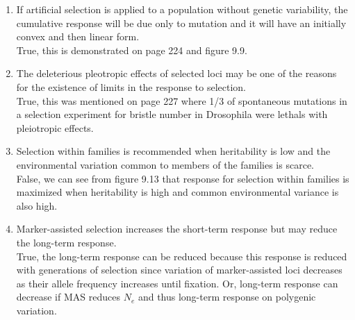 \documentclass[12pt]{amsart}
\begin{document}
\begin{enumerate}
\item If artificial selection is applied to a population without genetic variability, the cumulative response will be due only to mutation and it will have an initially convex and then linear form.\\
True, this is demonstrated on page 224 and figure 9.9.\\
\item The deleterious pleotropic effects of selected loci may be one of the reasons for the existence of limits in the response to selection.\\
True, this was mentioned on page 227 where 1/3 of spontaneous mutations in a selection experiment for bristle number in Drosophila were lethals with pleiotropic effects.\\
\item Selection within families is recommended when heritability is low and the environmental variation common to members of the families is scarce.\\
False, we can see from figure 9.13 that response for selection within families is maximized when heritability is high and common environmental variance is also high.\\
\item Marker-assisted selection increases the short-term response but may reduce the long-term response.\\
True, the long-term response can be reduced because this response is reduced with generations of selection since variation of marker-assisted loci decreases as their allele frequency increases until fixation. Or, long-term response can decrease if MAS reduces $N_e$ and thus long-term response on polygenic variation.
\end{enumerate}


\medskip
\end{document}
